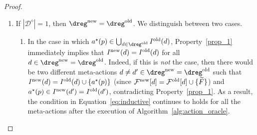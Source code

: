 \begin{proof}
\begin{enumerate}
		
		\item If $|\mathcal{D}^\diamond| = 1$, then $ \dreg^{\textnormal{new}} =  \dreg^{\textnormal{old}} $. We distinguish between two cases.
		\begin{enumerate}
			\item In the case in which $a^\star(p) \in \bigcup_{d \in \dreg^{\textnormal{old}}} I^{\textnormal{old}}(d)$, Property~\ref{prop_1} immediately implies that $I^{\textnormal{new}}(d) =  I^{\textnormal{old}}(d)  $ for all $d \in \dreg^{\textnormal{new}}=  \dreg^{\textnormal{old}} $.
			Indeed, if this is \emph{not} the case, then there would be two different meta-actions $d \neq d' \in \dreg^{\textnormal{new}}=  \dreg^{\textnormal{old}} $ such that $I^{\textnormal{new}}(d) =  I^{\textnormal{old}}(d)  \cup \{ a^\star(p) \}$ (since $\mathcal{F}^{\textnormal{new}}[d] = \mathcal{F}^{\textnormal{old}}[d] \cup \{ \widetilde{F} \}$) and $a^\star(p) \in I^{\textnormal{new}}(d') = I^{\textnormal{old}}(d')$, contradicting Property~\ref{prop_1}.
			As a result, the condition in Equation~\eqref{eq:inductive} continues to holds for all the meta-actions after the execution of Algorithm~\ref{alg:action_oracle}.
			

\end{enumerate}
\end{enumerate}
\end{proof}
